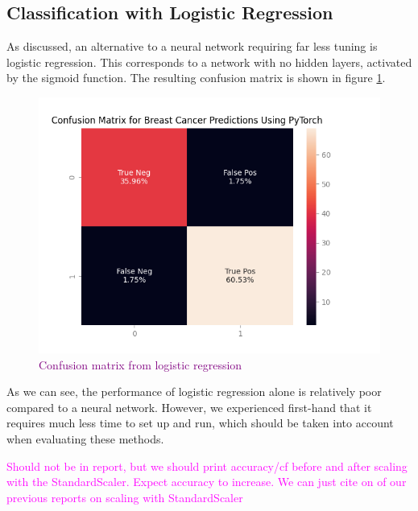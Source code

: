 \subsection{Classification with Logistic Regression}
As discussed, an alternative to a neural network requiring far less tuning is logistic regression. This corresponds to a network with no hidden layers, activated by the sigmoid function. The resulting confusion matrix is shown in figure \ref{fig:logreg}. 
\begin{figure}
    \centering
    \includegraphics[width=\linewidth]{figures/plots/logreg.png}
    \caption{\textcolor{purple}{Confusion matrix from logistic regression}}
    \label{fig:logreg}
\end{figure}

As we can see, the performance of logistic regression alone is relatively poor compared to a neural network. However, we experienced first-hand that it requires much less time to set up and run, which should be taken into account when evaluating these methods.

\textcolor{magenta}{Should not be in report, but we should print accuracy/cf before and after scaling with the StandardScaler. Expect accuracy to increase. We can just cite on of our previous reports on scaling with StandardScaler}



